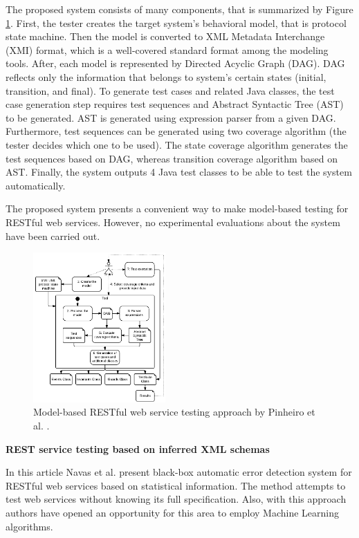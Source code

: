\documentclass[english]{tktltiki}
\begin{document}
The proposed system consists of many components, that is summarized by Figure \ref{fig:uml_system}. First, the tester creates the target system's behavioral model, that is protocol state machine. Then the model is converted to XML Metadata Interchange (XMI) format, which is a well-covered standard format among the modeling tools. After, each model is represented by Directed Acyclic Graph (DAG). DAG reflects only the information that belongs to system's certain states (initial, transition, and final). To generate test cases and related Java classes, the test case generation step requires test sequences and Abstract Syntactic Tree (AST) to be generated. AST is generated using expression parser from a given DAG. Furthermore, test sequences can be generated using two coverage algorithm (the tester decides which one to be used). The state coverage algorithm generates the test sequences based on DAG, whereas transition coverage algorithm based on AST. Finally, the system outputs 4 Java test classes to be able to test the system automatically.

The proposed system presents a convenient way to make model-based testing for RESTful web services. However, no experimental evaluations about the system have been carried out.

\begin{figure}[h]
	\begin{center}
		\includegraphics[width=0.45\textwidth]{images/uml_system.png}
		\caption{ Model-based RESTful web service testing approach by Pinheiro et al. \cite{pinheiro2013model}. }
		\label{fig:uml_system}
	\end{center}
\end{figure}

\textbf{REST service testing based on inferred XML schemas}

In this article Navas et al. \cite{navas2014rest} present black-box automatic error detection system for RESTful web services based on statistical information. The method attempts to test web services without knowing its full specification. Also, with this approach authors have opened an opportunity for this area to employ Machine Learning algorithms.
\end{document}
